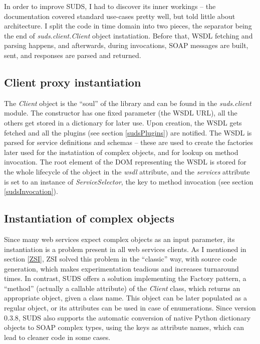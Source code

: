 In order to improve SUDS, I had to discover its inner workings -- the documentation covered standard use-cases pretty well, but told little about architecture. I split the code in time domain into two pieces, the separator being the end of \emph{suds.client.Client} object instatiation. Before that, WSDL fetching and parsing happens, and afterwards, during invocations, SOAP messages are built, sent, and responses are parsed and returned.

\subsection{Client proxy instantiation}

The \emph{Client} object is the ``soul'' of the library and can be found in the \emph{suds.client} module. The constructor has one fixed parameter (the WSDL URL), all the others get stored in a dictionary for later use. Upon creation, the WSDL gets fetched and all the plugins (see section \ref{sudsPlugins}) are notified. The WSDL is parsed for service definitions and schemas -- these are used to create the factories later used for the instatiation of complex objects, and for lookup on method invocation. The root element of the DOM representing the WSDL is stored for the whole lifecycle of the object in the \emph{wsdl} attribute, and the \emph{services} attribute is set to an instance of \emph{ServiceSelector}, the key to method invocation (see section \ref{sudsInvocation}).

\subsection{Instantiation of complex objects}

Since many web services expect complex objects as an input parameter, its instantiation is a problem present in all web services clients. As I mentioned in section \ref{ZSI}, ZSI solved this problem in the ``classic'' way, with source code generation, which makes experimentation teadious and increases turnaround times. In contrast, SUDS offers a solution implementing the Factory pattern, a ``method'' (actually a callable attribute) of the \emph{Client} class, which returns an appropriate object, given a class name. This object can be later populated as a regular object, or its attributes can be used in case of enumerations. Since version 0.3.8, SUDS also supports the automatic conversion of native Python dictionary objects to SOAP complex types, using the keys as attribute names, which can lead to cleaner code in some cases.


